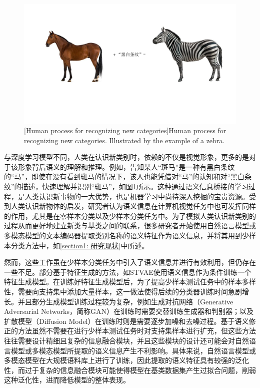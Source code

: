 \begin{figure}[h!]
  \centering
  \includegraphics[width=0.9\columnwidth]{figures/SVMSMA/人类认识新类别示意图.pdf}
  [Human process for recognizing new categories]{Human process for recognizing new categories. Illustrated by the example of a zebra.}
  \label{figure4: 人类认识新类别示意图}
\end{figure}

与深度学习模型不同，人类在认识新类别时，依赖的不仅是视觉形象，更多的是对于该形象背后语义的理解和推理。例如，告知某人“斑马”是一种有黑白条纹的“马”，即使在没有看到斑马的情况下，该人也能凭借对“马”的认知和对“黑白条纹”的描述，快速理解并识别“斑马”，如图\ref{figure4: 人类认识新类别示意图}所示。这种通过语义信息桥接的学习过程，是人类认识新事物的一大优势，也是机器学习中尚待深入挖掘的宝贵资源。受到人类认识新物体的启发，研究者认为语义信息在计算机视觉任务中也可发挥同样的作用，尤其是在零样本分类\cite{metric1, metric2, metric3, generative1, generative2, generative3, 零样本学习}以及少样本分类\cite{KTN, AM3, TRAML, yan2021aligning, CMGNN-DPGN, STVAE, SP-CLIP, 赵凯琳2020小样本学习研究综述, 小样本困境下的深度学习图像识别综述}任务中。为了模拟人类认识新类别的过程从而更好地建立新类与基类之间的联系，很多研究者开始使用自然语言模型\cite{Word2Vec, GloVe, Bert}或多模态模型\cite{Clip}的文本编码器提取类别名称的语义特征作为语义信息，并将其用到少样本分类方法中，如\ref{section1: 研究现状}中所述。


然而，这些工作虽在少样本分类任务中引入了语义信息并进行有效利用，但仍存在一些不足。部分基于特征生成的方法，如STVAE\cite{STVAE}使用语义信息作为条件训练一个特征生成模型。在训练好特征生成模型后，为了提高少样本测试任务中的样本多样性，需要向支持集中添加大量样本，这一做法使得后续的分类器训练时间急剧增长。并且部分生成模型训练过程较为复杂，例如生成对抗网络（Generative Adversarial Networks，简称GAN）\cite{GAN}在训练时需要交替训练生成器和判别器；以及扩散模型（Diffusion Model）\cite{diffusion}在训练时则是需要逐步加噪和去噪过程。基于语义修正的方法\cite{AM3, SP-CLIP}虽然不需要在进行少样本测试任务时对支持集样本进行扩充，但这些方法往往需要设计精细且复杂的信息融合模块，并且这些模块的设计还可能会对自然语言模型或多模态模型所提取的语义信息产生不利影响。具体来说，自然语言模型或多模态模型在大规模语料库上进行了训练，因此提取的语义特征具有较强的泛化性，而过于复杂的信息融合模块可能使得模型在基类数据集产生过拟合问题，削弱这种泛化性，进而降低模型的整体表现。



